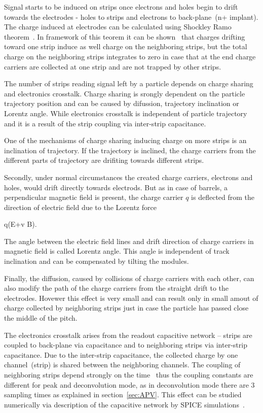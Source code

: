 Signal starts to be induced on strips once electrons and holes begin to drift towards the electrodes - holes to strips and electrons to back-plane~(n+ implant). The charge induced at electrodes can be calculated using Shockley Ramo theorem~\cite{doi:10.1063/1.1710367,Ramo:1939vr}. In framework of this teorem it can be shown~\cite{Bloch:2007zza} that charges drifting toward one strip induce as well charge on the neighboring strips, but the total charge on the neighboring strips integrates to zero in case that at the end charge carriers are collected at one strip and are not trapped by other strips.

The number of strips reading signal left by a particle depends on charge sharing and electronics crosstalk. Charge sharing is srongly dependent on the particle trajectory position and can be caused by difussion, trajectory inclination or Lorentz angle. While electronics crosstalk is independent of particle trajectory and it is a result of the strip coupling via inter-strip capacitance. 

One of the mechanisms of charge sharing inducing charge on more strips is an inclination of trajectory. If the trajectory is inclined, the charge carriers from the different parts of trajectory are drifiting towards different strips.

Secondly, under normal circumstances the created charge carriers, electrons and holes, would drift directly towards electrods. But as in case of barrels, a perpendicular magnetic field is present, the charge carrier $q$ is deflected from the direction of electric field due to the Lorentz force

{
    q(E+v \times B).
}

The angle between the electric field lines and drift direction of charge carriers in magnetic field is called Lorentz angle. This angle is independent of track inclination and can be compensated by tilting the modules.

Finally, the diffusion, caused by collisions of charge carriers with each other, can also modify the path of the charge carriers from the straight drift to the electrodes. Hovewer this effect is very small and can result only in small amout of charge collected by neighboring strips just in case the particle has passed close the middle of the pitch.


The electronics crosstalk arises from the readout capacitive network -- strips are coupled to back-plane via capacitance and to neighboring strips via inter-strip capacitance. Due to the inter-strip capacitance, the collected charge by one channel~(strip) is shared between the neighboring channels. The coupling of neighboring strips depend strongly on the time~\cite{Bloch:2007zza} thus the coupling constants are different for peak and deconvolution mode, as in deconvolution mode there are 3 sampling times as explained in section~\ref{sec:APV}. This effect can be studied numerically via description of the capacitive network by SPICE simulations~\cite{Barberis:1993ph}.


